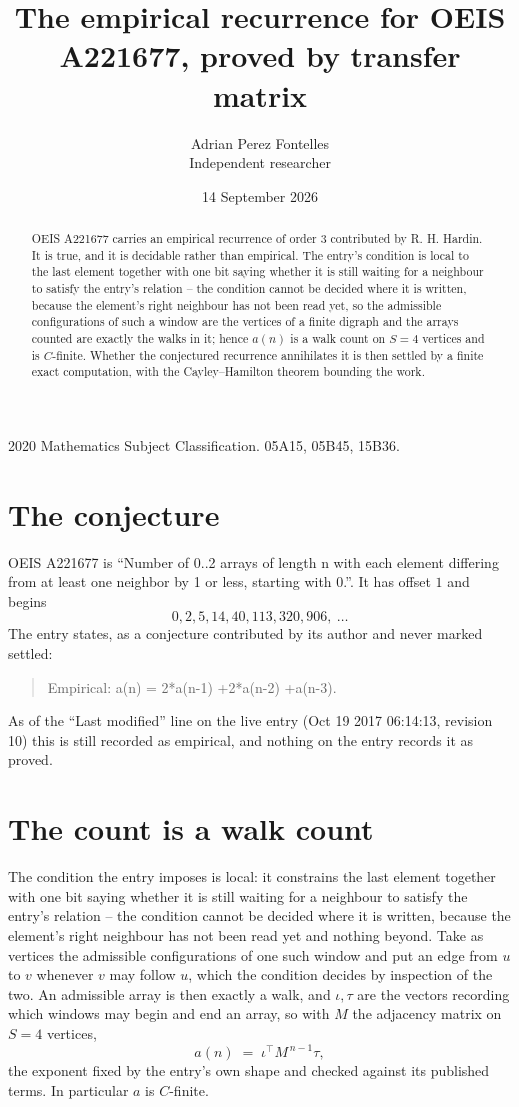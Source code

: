 \documentclass[11pt,a4paper]{article}
\title{The empirical recurrence for OEIS A221677, proved by transfer matrix}
\author{Adrian Perez Fontelles\\ \small Independent researcher}
\date{14 September 2026}
\theoremstyle{plain}
\theoremstyle{definition}
\begin{document}
\maketitle

\begin{abstract}
OEIS A221677 carries an empirical recurrence of order $3$ contributed by R. H. Hardin. It is
true, and it is decidable rather than empirical. The entry's condition is local to the last element together with one bit saying whether it is still waiting for a neighbour to satisfy the entry's relation -- the condition cannot be decided where it is written, because the element's right neighbour has not been read yet, so
the admissible configurations of such a window are the vertices of a finite digraph and the
arrays counted are exactly the walks in it; hence $a(n)$ is a walk count on $S=4$ vertices
and is $C$-finite. Whether the conjectured recurrence annihilates it is then settled by a
finite exact computation, with the Cayley--Hamilton theorem bounding the work.
\end{abstract}

\noindent\small 2020 Mathematics Subject Classification. 05A15, 05B45, 15B36.\normalsize

\section{The conjecture}

OEIS A221677 is ``Number of 0..2 arrays of length n with each element differing from at least one neighbor by 1 or less, starting with 0.''. It has offset $1$ and begins
\[
0, 2, 5, 14, 40, 113, 320, 906,\ \dots
\]
The entry states, as a conjecture contributed by its author and never marked settled:
\begin{quote}
Empirical: a(n) = 2*a(n-1) +2*a(n-2) +a(n-3).
\end{quote}
As of the ``Last modified'' line on the live entry (Oct 19 2017 06:14:13, revision 10) this is still
recorded as empirical, and nothing on the entry records it as proved.

\section{The count is a walk count}

The condition the entry imposes is local: it constrains the last element together with one bit saying whether it is still waiting for a neighbour to satisfy the entry's relation -- the condition cannot be decided where it is written, because the element's right neighbour has not been read yet and nothing beyond. Take as vertices the admissible configurations of one such window and put an edge from $u$ to $v$ whenever $v$ may follow $u$, which the condition decides by inspection of the two.
An admissible array is then exactly a walk, and $\iota,\tau$ are the vectors recording which windows may begin and end an array, so with $M$ the adjacency matrix on $S=4$ vertices,
\[
a(n)\;=\;\iota^{\!\top}M^{\,n-1}\tau ,
\]
the exponent fixed by the entry's own shape and checked against its published terms. In
particular $a$ is $C$-finite.
\end{document}
